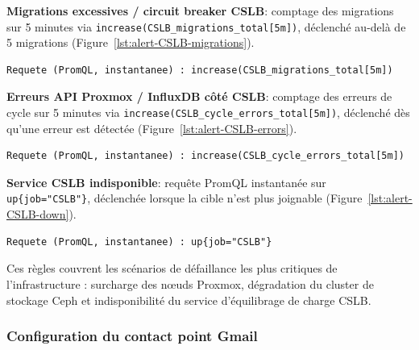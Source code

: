 \medskip
\par \textbf{\textcolor{bleu}{Migrations excessives / circuit breaker CSLB}}: comptage des migrations sur 5 minutes via \texttt{increase(CSLB\_migrations\_total[5m])}, déclenché au-delà de 5 migrations (Figure~\ref{lst:alert-CSLB-migrations}).\\

\begin{lstlisting}[style=sonacode,language={},caption={Règle d'alerte - Migrations excessives / circuit breaker CSLB},label={lst:alert-CSLB-migrations}]
Requete (PromQL, instantanee) : increase(CSLB_migrations_total[5m])
\end{lstlisting}

\medskip
\par \textbf{\textcolor{bleu}{Erreurs API Proxmox / InfluxDB côté CSLB}}: comptage des erreurs de cycle sur 5 minutes via \texttt{increase(CSLB\_cycle\_errors\_total[5m])}, déclenché dès qu'une erreur est détectée (Figure~\ref{lst:alert-CSLB-errors}).\\

\begin{lstlisting}[style=sonacode,language={},caption={Règle d'alerte - Erreurs API Proxmox / InfluxDB côté CSLB},label={lst:alert-CSLB-errors}]
Requete (PromQL, instantanee) : increase(CSLB_cycle_errors_total[5m])
\end{lstlisting}
\par \textbf{\textcolor{bleu}{Service CSLB indisponible}}: requête PromQL instantanée sur \texttt{up\{job="CSLB"\}}, déclenchée lorsque la cible n'est plus joignable (Figure~\ref{lst:alert-CSLB-down}).\\

\begin{lstlisting}[style=sonacode,language={},caption={Règle d'alerte - Service CSLB indisponible},label={lst:alert-CSLB-down}]
Requete (PromQL, instantanee) : up{job="CSLB"}
\end{lstlisting}

\par Ces règles couvrent les scénarios de défaillance les plus critiques de l'infrastructure : surcharge des nœuds Proxmox, dégradation du cluster de stockage Ceph et indisponibilité du service d'équilibrage de charge CSLB.\\

\subsubsection{Configuration du contact point Gmail}

